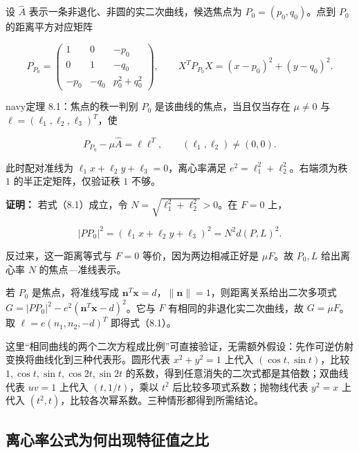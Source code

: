 \documentclass[11pt,a4paper]{article}
\begin{document}
设 \(\widehat A\) 表示一条非退化、非圆的实二次曲线，候选焦点为
\(P_0=(p_0,q_0)\)。点到 \(P_0\) 的距离平方对应矩阵

\begin{equation*}
P_{P_0}=\begin{pmatrix}1&0&-p_0\\0&1&-q_0\\-p_0&-q_0&p_0^2+q_0^2\end{pmatrix},\qquad X^TP_{P_0}X=(x-p_0)^2+(y-q_0)^2.
\end{equation*}

\begin{sboxenv}{navy}{定理 8.1：焦点的秩一判别}
\(P_0\) 是该曲线的焦点，当且仅当存在 \(\mu\ne0\) 与
\(\ell=(\ell_1,\ell_2,\ell_3)^T\)，使

\begin{equation*}
P_{P_0}-\mu\widehat A=\ell\ell^T,\qquad (\ell_1,\ell_2)\ne(0,0).\tag{8.1}
\end{equation*}

此时配对准线为 \(\ell_1x+\ell_2y+\ell_3=0\)，离心率满足
\(e^2=\ell_1^2+\ell_2^2\)。右端须为秩 \(1\) 的半正定矩阵，仅验证秩 \(1\)
不够。

\end{sboxenv}

\textbf{证明：} 若式（8.1）成立，令 \(N=\sqrt{\ell_1^2+\ell_2^2}>0\)。在
\(F=0\) 上，

\begin{equation*}
|PP_0|^2=(\ell_1x+\ell_2y+\ell_3)^2=N^2d(P,L)^2.
\end{equation*}

反过来，这一距离等式与 \(F=0\) 等价，因为两边相减正好是 \(\mu F\)。故
\(P_0,L\) 给出离心率 \(N\) 的焦点---准线表示。

若 \(P_0\) 是焦点，将准线写成
\(\boldsymbol n^T\boldsymbol x=d\)，\(\|\boldsymbol n\|=1\)，则距离关系给出二次多项式
\(G=|PP_0|^2-e^2(\boldsymbol n^T\boldsymbol x-d)^2\)。它与 \(F\)
有相同的非退化实二次曲线，故 \(G=\mu F\)。取 \(\ell=e(n_1,n_2,-d)^T\)
即得式（8.1）。

这里``相同曲线的两个二次方程成比例''可直接验证，无需额外假设：先作可逆仿射变换将曲线化到三种代表形。圆形代表
\(x^2+y^2=1\) 上代入 \((\cos t,\sin t)\)，比较
\(1,\cos t,\sin t,\cos2t,\sin2t\)
的系数，得到任意消失的二次式都是其倍数；双曲线代表 \(uv=1\) 上代入
\((t,1/t)\)，乘以 \(t^2\) 后比较多项式系数；抛物线代表 \(y^2=x\) 上代入
\((t^2,t)\)，比较各次幂系数。三种情形都得到所需结论。

\subsection{离心率公式为何出现特征值之比}\label{ux79bbux5fc3ux7387ux516cux5f0fux4e3aux4f55ux51faux73b0ux7279ux5f81ux503cux4e4bux6bd4}
\end{document}
